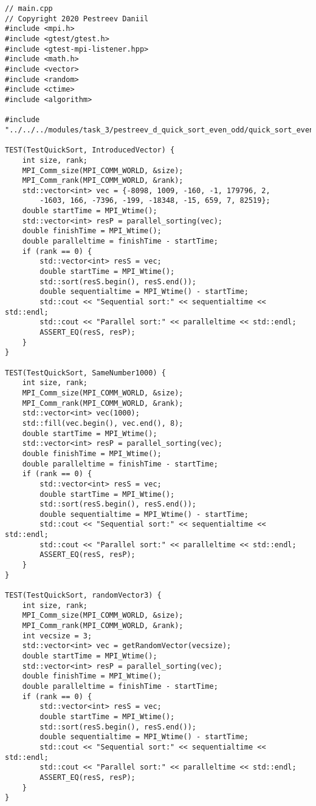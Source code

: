 \documentclass{report}
\begin{document}
\begin{lstlisting}
// main.cpp
// Copyright 2020 Pestreev Daniil
#include <mpi.h>
#include <gtest/gtest.h>
#include <gtest-mpi-listener.hpp>
#include <math.h>
#include <vector>
#include <random>
#include <ctime>
#include <algorithm>

#include "../../../modules/task_3/pestreev_d_quick_sort_even_odd/quick_sort_even_odd_merge.h"

TEST(TestQuickSort, IntroducedVector) {
    int size, rank;
    MPI_Comm_size(MPI_COMM_WORLD, &size);
    MPI_Comm_rank(MPI_COMM_WORLD, &rank);
    std::vector<int> vec = {-8098, 1009, -160, -1, 179796, 2,
        -1603, 166, -7396, -199, -18348, -15, 659, 7, 82519};
    double startTime = MPI_Wtime();
    std::vector<int> resP = parallel_sorting(vec);
    double finishTime = MPI_Wtime();
    double paralleltime = finishTime - startTime;
    if (rank == 0) {
        std::vector<int> resS = vec;
        double startTime = MPI_Wtime();
        std::sort(resS.begin(), resS.end());
        double sequentialtime = MPI_Wtime() - startTime;
        std::cout << "Sequential sort:" << sequentialtime << std::endl;
        std::cout << "Parallel sort:" << paralleltime << std::endl;
        ASSERT_EQ(resS, resP);
    }
}

TEST(TestQuickSort, SameNumber1000) {
    int size, rank;
    MPI_Comm_size(MPI_COMM_WORLD, &size);
    MPI_Comm_rank(MPI_COMM_WORLD, &rank);
    std::vector<int> vec(1000);
    std::fill(vec.begin(), vec.end(), 8);
    double startTime = MPI_Wtime();
    std::vector<int> resP = parallel_sorting(vec);
    double finishTime = MPI_Wtime();
    double paralleltime = finishTime - startTime;
    if (rank == 0) {
        std::vector<int> resS = vec;
        double startTime = MPI_Wtime();
        std::sort(resS.begin(), resS.end());
        double sequentialtime = MPI_Wtime() - startTime;
        std::cout << "Sequential sort:" << sequentialtime << std::endl;
        std::cout << "Parallel sort:" << paralleltime << std::endl;
        ASSERT_EQ(resS, resP);
    }
}

TEST(TestQuickSort, randomVector3) {
    int size, rank;
    MPI_Comm_size(MPI_COMM_WORLD, &size);
    MPI_Comm_rank(MPI_COMM_WORLD, &rank);
    int vecsize = 3;
    std::vector<int> vec = getRandomVector(vecsize);
    double startTime = MPI_Wtime();
    std::vector<int> resP = parallel_sorting(vec);
    double finishTime = MPI_Wtime();
    double paralleltime = finishTime - startTime;
    if (rank == 0) {
        std::vector<int> resS = vec;
        double startTime = MPI_Wtime();
        std::sort(resS.begin(), resS.end());
        double sequentialtime = MPI_Wtime() - startTime;
        std::cout << "Sequential sort:" << sequentialtime << std::endl;
        std::cout << "Parallel sort:" << paralleltime << std::endl;
        ASSERT_EQ(resS, resP);
    }
}


\end{lstlisting}
\end{document}
